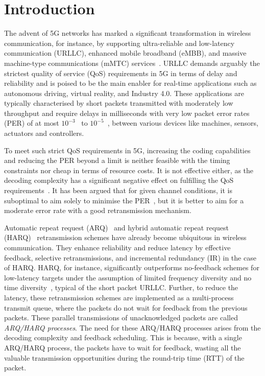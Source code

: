 
\section{Introduction}\label{sec:intro}
The advent of 5G networks has marked a significant transformation in wireless communication, for instance, by supporting ultra-reliable and low-latency communication (URLLC), enhanced mobile broadband (eMBB), and massive machine-type communications (mMTC) services~\cite{3gpp2017study,popovski20185G,3gpp.22.104}. 
URLLC demands arguably the strictest quality of service (QoS) requirements in 5G in terms of delay and reliability and is poised to be the main enabler for real-time applications such as autonomous driving, virtual reality, and Industry 4.0\cite{sisinni2018industrial}. 
These applications are typically characterised by short packets transmitted with moderately low throughput\cite{durisi2016URLLC} and require delays in milliseconds with very low packet error rates (PER) of at most $10^{-3}$~\cite{popovski20226g} to $10^{-5}$~\cite{3gpp.38.913}, between various devices like machines, sensors, actuators and controllers.

To meet such strict QoS requirements in 5G, increasing the coding capabilities and reducing the PER beyond a limit is neither feasible with the timing constraints nor cheap in terms of resource costs. 
It is not effective either, as the decoding complexity has a significant negative effect on fulfilling the QoS requirements~\cite{celebi2021latency}. It has been argued that for given channel conditions, it is suboptimal to aim solely to minimise the PER~\cite{Peng2011ReliabilityPHY}, but it is better to aim for a moderate error rate with a good retransmission mechanism.

Automatic repeat request (ARQ)~\cite{ArqCommEngDeskRef} and hybrid automatic repeat request (HARQ)~\cite{Frenger2001HarqHSDPA,DAHLMAN2014299} retransmission schemes have already become ubiquitous in wireless communication. They enhance reliability and reduce latency by effective feedback, selective retransmissions, and incremental redundancy (IR) in the case of HARQ. HARQ, for instance, significantly outperforms no-feedback schemes for low-latency targets under the assumption of limited frequency diversity and no time diversity~\cite{Ostman2018Harq}, typical of the short packet URLLC.
Further, to reduce the latency, these retransmission schemes are implemented as a multi-process transmit queue, where the packets do not wait for feedback from the previous packets. These parallel transmissions of unacknowledged packets are called \textit{ARQ/HARQ processes}.
The need for these ARQ/HARQ processes arises from the decoding complexity and feedback scheduling. This is because, with a single ARQ/HARQ process, the packets have to wait for feedback, wasting all the valuable transmission opportunities during the round-trip time (RTT) of the packet.


